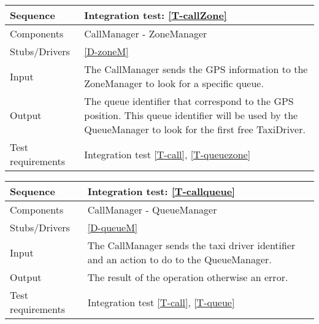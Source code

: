 \begin{table}[H]
    \begin{tabularx}{\textwidth}{l|X}
        \hline
        Sequence
        & 
        Integration test: \ref{T-callZone}
        \\ \hline
        Components 
        & 
        CallManager - ZoneManager
        \\ \hline
        Stubs/Drivers 
        & 
        \ref{D-zoneM}
        \\ \hline
        Input 
        & 
        The CallManager sends the GPS information to the ZoneManager to look for a specific queue.
        \\ \hline
        Output 
        & 
        The queue identifier that correspond to the GPS position. This queue identifier will be used by the QueueManager to look for the first free TaxiDriver.
        \\ \hline
        Test requirements 
        & 
        Integration test \ref{T-call}, \ref{T-queuezone}
        \\ \hline
    \end{tabularx}
\end{table}

\begin{table}[H]
    \begin{tabularx}{\textwidth}{l|X}
        \hline
        Sequence
        & 
        Integration test: \ref{T-callqueue}
        \\ \hline
        Components 
        & 
        CallManager - QueueManager
        \\ \hline
        Stubs/Drivers 
        & 
        \ref{D-queueM}
        \\ \hline
        Input 
        & 
        The CallManager sends the taxi driver identifier and an action to do to the QueueManager.
        \\ \hline
        Output 
        & 
        The result of the operation otherwise an error.
        \\ \hline
        Test requirements 
        & 
        Integration test \ref{T-call}, \ref{T-queue}
        \\ \hline
    \end{tabularx}
\end{table}
